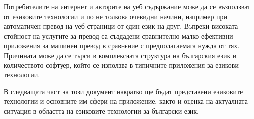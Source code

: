 \documentclass[]{../../metanetpaper}
\begin{document}
\begin{multicols}{2}
Потребителите на интернет и авторите на уеб съдържание може да се възползват от езиковите технологии и по не толкова очевидни начини, например при автоматичен превод на уеб страници от един език на друг. Въпреки високата стойност на услугите за превод са създадени сравнително малко ефективни приложения за машинен превод в сравнение с предполагаемата нужда от тях. Причината може да се търси в комплексната структура на българския език и количеството софтуер, който се използва в типичните приложения за езикови технологии. 

В следващата част на този документ накратко ще бъдат представени езиковите технологии и основните им сфери на приложение, както и оценка на актуалната ситуация в областта на езиковите технологии за български език. 
\end{multicols}

\clearpage


\end{document}
